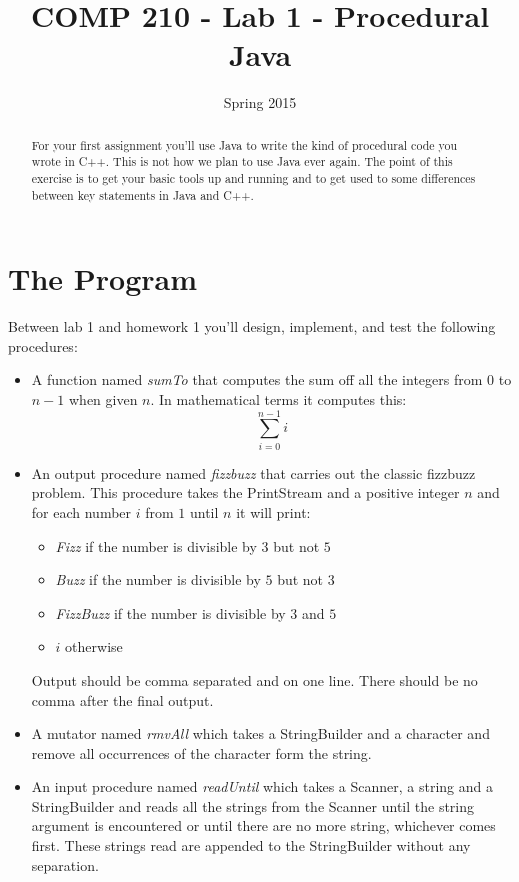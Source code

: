 \documentclass[]{tufte-handout}
\title{COMP 210 - Lab 1 - Procedural Java}
\date{Spring 2015}
\begin{document}
\maketitle

\begin{abstract}
For your first assignment you'll use Java to write the kind of procedural code you wrote in C++. This is not how we plan to use Java ever again. The point of this exercise is to get your basic tools up and running and to get used to some differences between key statements in Java and C++.
\end{abstract}

\section{The Program}

Between lab 1 and homework 1 you'll design, implement, and test the following procedures:
\begin{itemize}
\item A function named \textit{sumTo} that computes the sum off all the integers from $0$ to $n-1$ when given $n$. In mathematical terms it computes this:
\[
\sum\limits_{i=0}^{n-1} i 
\] 

\item An output procedure named \textit{fizzbuzz} that carries out the classic fizzbuzz problem. This procedure takes the PrintStream and a positive integer $n$ and for each number $i$ from $1$ until $n$ it will print:
\begin{itemize}
\item \textit{Fizz} if the number is divisible by $3$ but not $5$
\item \textit{Buzz} if the number is divisible by $5$ but not $3$
\item \textit{FizzBuzz} if the number is divisible by $3$ and $5$
\item $i$ otherwise
\end{itemize}
Output should be comma separated and on one line. There should be no comma after the final output. 

\item A mutator named \textit{rmvAll} which takes a StringBuilder and a character and remove all occurrences of the character form the string. 

\item An input procedure named \textit{readUntil} which takes a Scanner, a string and a StringBuilder and reads all the strings from the Scanner until the string argument is encountered or until there are no more string, whichever comes first. These strings read are appended to the StringBuilder without any separation. 
\end{itemize}
\end{document}
